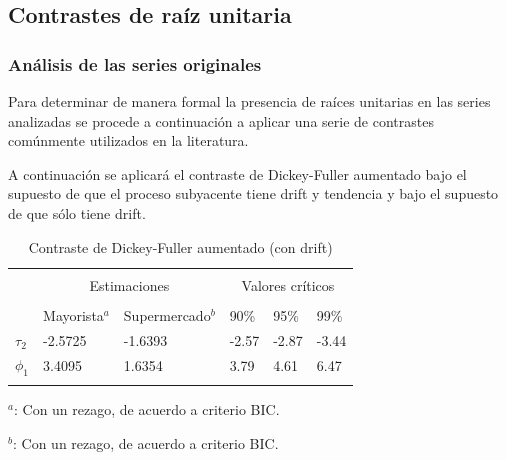 \documentclass[12pt, twoside]{book}\usepackage[]{graphicx}\usepackage[]{color}
\numberwithin{equation}{section}
\numberwithin{theorem}{section}
\numberwithin{teorema}{section}
\numberwithin{defi}{section}
\numberwithin{prop}{section}
\numberwithin{defi}{section}
\theoremstyle{plain}
\begin{document}
\subsection{Contrastes de raíz unitaria}

\subsubsection{Análisis de las series originales}
Para determinar de manera formal la presencia de raíces unitarias en las series analizadas se procede a continuación a aplicar una serie de contrastes comúnmente utilizados en la literatura. 




A continuación se aplicará el contraste de Dickey-Fuller aumentado bajo el supuesto de que el proceso subyacente tiene drift y tendencia y bajo el supuesto de que sólo tiene drift. 

\begin{center}
\begin{table}[!htpb]
\caption{Contraste de Dickey-Fuller aumentado (con drift)\label{tab:dickey1}}
\centering
\begin{threeparttable}
\begin{tabular}{@{}llllll@{}}
\toprule \\
\multicolumn{1}{l}{} & \multicolumn{2}{c}{Estimaciones} &
\multicolumn{3}{c}{Valores críticos} \\
\cmidrule(l){2-3} \cmidrule(l){4-6} \\
\multicolumn{1}{l}{} & \multicolumn{1}{c}{Mayorista$^{a}$} &
 \multicolumn{1}{c}{Supermercado$^{b}$} &
\multicolumn{1}{l}{90\%}&
\multicolumn{1}{l}{95\%}&
\multicolumn{1}{l}{99\%}
\\
\midrule
$\tau_{2} $  & -2.5725 &  -1.6393  & -2.57 & -2.87 & -3.44 \\
$\phi_{1} $  & 3.4095  &  1.6354   & 3.79 & 4.61 &  6.47\\
\bottomrule \\
\end{tabular}
\begin{tablenotes}
\small 
\item $^{a}$: Con un rezago, de acuerdo a criterio BIC. 
\item $^{b}$: Con un rezago, de acuerdo a criterio BIC. 
\end{tablenotes}
\end{threeparttable}
\end{table}
\end{center}
\end{document}
